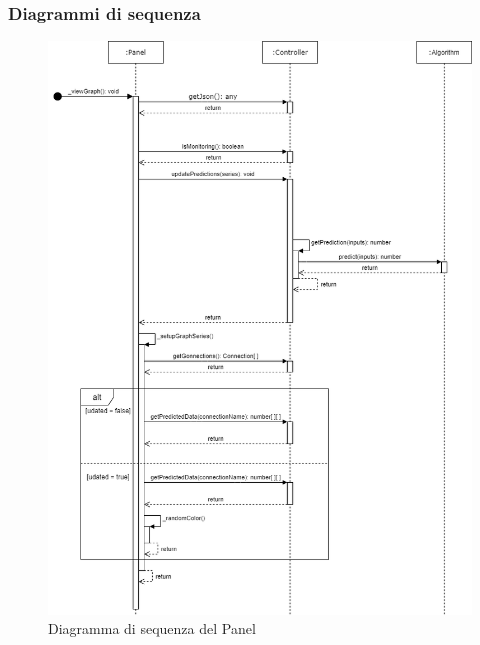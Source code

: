 \subsubsection{Diagrammi di sequenza}
\begin{figure}[H]
\centering
\includegraphics[scale=0.55]{../../Diagrams/Sequence_diagrams/viewGraph.png}
\caption{Diagramma di sequenza del Panel}
\end{figure}

